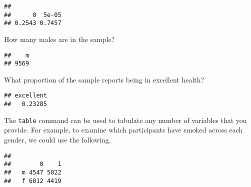 \documentclass[]{article}
\newenvironment{Shaded}{\begin{snugshade}}{\end{snugshade}}
\newcommand{\KeywordTok}[1]{\textcolor[rgb]{0.13,0.29,0.53}{\textbf{#1}}}
\newcommand{\DecValTok}[1]{\textcolor[rgb]{0.00,0.00,0.81}{#1}}
\newcommand{\StringTok}[1]{\textcolor[rgb]{0.31,0.60,0.02}{#1}}
\newcommand{\OperatorTok}[1]{\textcolor[rgb]{0.81,0.36,0.00}{\textbf{#1}}}
\newcommand{\NormalTok}[1]{#1}
\begin{document}
\begin{Shaded}
\end{Shaded}

\begin{verbatim}
## 
##      0  5e-05 
## 0.2543 0.7457
\end{verbatim}

How many males are in the sample?

\begin{Shaded}
\end{Shaded}

\begin{verbatim}
##    m 
## 9569
\end{verbatim}

What proportion of the sample reports being in excellent health?

\begin{Shaded}
\end{Shaded}

\begin{verbatim}
## excellent 
##   0.23285
\end{verbatim}

The \texttt{table} command can be used to tabulate any number of
variables that you provide. For example, to examine which participants
have smoked across each gender, we could use the following.

\begin{Shaded}
\end{Shaded}

\begin{verbatim}
##    
##        0    1
##   m 4547 5022
##   f 6012 4419
\end{verbatim}
\end{document}
